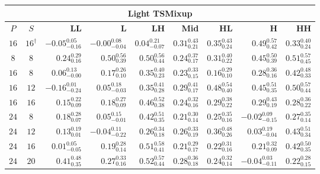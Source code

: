 \begin{table}[!tbp]
    \centering
    \small
    \setlength{\tabcolsep}{5pt}
    \begin{tabular}{@{}ccrrrrrrr@{}}
        \toprule
        \multicolumn{9}{c}{\textbf{Light TSMixup}} \\
        \midrule
        \textbf{$P$} & \textbf{$S$} & \textbf{LL} & \textbf{L} & \textbf{LH} & \textbf{Mid} & \textbf{HL} & \textbf{H} & \textbf{HH} \\
        \midrule
        $16$ & $16^{\dagger}$ & $-0.05_{-0.16}^{0.05}$ & $-0.00_{-0.04}^{0.08}$ & $0.04_{-0.07}^{0.21}$ & $0.31_{0.21}^{0.43}$ & $0.35_{0.24}^{0.43}$ & $0.49_{0.42}^{0.57}$ & $0.33_{0.24}^{0.40}$ \\
        \midrule
        \addlinespace[2pt]
        $8$ & $8$ & $0.24_{0.16}^{0.29}$ & $0.50_{0.39}^{0.56}$ & $0.50_{0.44}^{0.56}$ & $0.24_{0.17}^{0.37}$ & $0.31_{0.22}^{0.40}$ & $0.45_{0.39}^{0.50}$ & $0.51_{0.45}^{0.57}$ \\
        \addlinespace[2pt]
        $16$ & $8$ & $0.06_{-0.00}^{0.13}$ & $0.17_{0.10}^{0.26}$ & $0.35_{0.23}^{0.40}$ & $0.23_{0.15}^{0.33}$ & $0.16_{0.10}^{0.29}$ & $0.28_{0.16}^{0.36}$ & $0.42_{0.33}^{0.48}$ \\
        $16$ & $12$ & $-0.16_{-0.24}^{0.01}$ & $0.05_{-0.03}^{0.18}$ & $0.35_{0.28}^{0.41}$ & $0.29_{0.17}^{0.41}$ & $0.48_{0.40}^{0.54}$ & $0.45_{0.35}^{0.51}$ & $0.50_{0.44}^{0.57}$ \\
        $16$ & $16$ & $0.15_{0.09}^{0.22}$ & $0.18_{0.09}^{0.27}$ & $0.46_{0.38}^{0.52}$ & $0.24_{0.16}^{0.32}$ & $0.29_{0.22}^{0.38}$ & $0.29_{0.19}^{0.43}$ & $0.28_{0.22}^{0.36}$ \\
        \addlinespace[2pt]
        $24$ & $8$ & $0.18_{0.07}^{0.28}$ & $0.05_{-0.01}^{0.15}$ & $0.42_{0.35}^{0.51}$ & $0.21_{0.14}^{0.30}$ & $0.25_{0.16}^{0.35}$ & $-0.02_{-0.15}^{0.09}$ & $0.27_{0.14}^{0.35}$ \\
        $24$ & $12$ & $0.13_{0.01}^{0.19}$ & $-0.04_{-0.22}^{0.11}$ & $0.26_{0.18}^{0.34}$ & $0.26_{0.19}^{0.33}$ & $0.36_{0.26}^{0.48}$ & $0.03_{-0.04}^{0.19}$ & $0.43_{0.34}^{0.51}$ \\
        $24$ & $16$ & $0.01_{-0.05}^{0.05}$ & $0.19_{0.14}^{0.28}$ & $0.51_{0.41}^{0.58}$ & $0.21_{0.17}^{0.29}$ & $0.22_{0.16}^{0.31}$ & $0.21_{0.09}^{0.32}$ & $0.42_{0.35}^{0.50}$ \\
        $24$ & $20$ & $0.41_{0.35}^{0.48}$ & $0.27_{0.16}^{0.33}$ & $0.52_{0.44}^{0.57}$ & $0.28_{0.18}^{0.36}$ & $0.24_{0.14}^{0.32}$ & $-0.04_{-0.11}^{0.03}$ & $0.22_{0.15}^{0.28}$ \\

\end{tabular}
\end{table}
